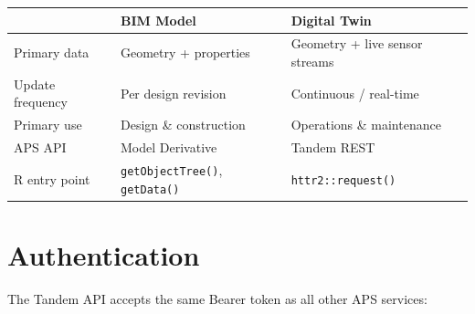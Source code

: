 \documentclass[
  11pt,
  letterpaper,
  DIV=11,
  numbers=noendperiod]{scrreprt}
\newenvironment{Shaded}{\begin{snugshade}}{\end{snugshade}}
\newcommand{\AttributeTok}[1]{\textcolor[rgb]{0.40,0.45,0.13}{#1}}
\newcommand{\FunctionTok}[1]{\textcolor[rgb]{0.28,0.35,0.67}{#1}}
\newcommand{\NormalTok}[1]{\textcolor[rgb]{0.00,0.23,0.31}{#1}}
\newcommand{\OtherTok}[1]{\textcolor[rgb]{0.00,0.23,0.31}{#1}}
\newcommand{\SpecialCharTok}[1]{\textcolor[rgb]{0.37,0.37,0.37}{#1}}
\newcommand{\StringTok}[1]{\textcolor[rgb]{0.13,0.47,0.30}{#1}}
\begin{document}
\begin{longtable}[]{@{}
  >{\raggedright\arraybackslash}p{}
  >{\raggedright\arraybackslash}p{}
  >{\raggedright\arraybackslash}p{}@{}}
\toprule\noalign{}
\begin{minipage}[b]{\linewidth}\raggedright
\end{minipage} & \begin{minipage}[b]{\linewidth}\raggedright
BIM Model
\end{minipage} & \begin{minipage}[b]{\linewidth}\raggedright
Digital Twin
\end{minipage} \\
\midrule\noalign{}
\endhead
\bottomrule\noalign{}
\endlastfoot
Primary data & Geometry + properties & Geometry + live sensor streams \\
Update frequency & Per design revision & Continuous / real-time \\
Primary use & Design \& construction & Operations \& maintenance \\
APS API & Model Derivative & Tandem REST \\
R entry point & \texttt{getObjectTree()}, \texttt{getData()} &
\texttt{httr2::request()} \\
\end{longtable}

\section{Authentication}\label{authentication-1}

The Tandem API accepts the same Bearer token as all other APS services:

\begin{Shaded}
\end{Shaded}
\end{document}
